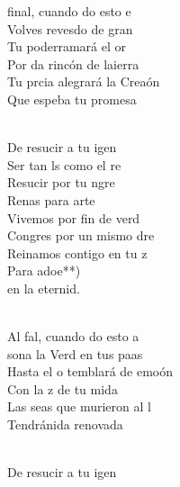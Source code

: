 \documentclass[12pt]{article}
\begin{document}
\begin{multicols*}{2}
\begin{cancion}%
	 final, cuando do esto e \\
	Volves revesdo de gran  \\
	Tu poderramará el or\\
	Por da rincón de laierra\\
	Tu prcia alegrará la Creaón\\
	Que espeba tu promesa\\\jump\\
	\begin{chorus}%
	De resucir a tu igen\\
	Ser tan ls como el re\\
	Resucir por tu ngre\\
	Renas para arte\\
	Vivemos por fin de verd\\
	Congres por un mismo dre\\
	Reinamos contigo en tu z\\
	Para adoe**)\\
	en la eternid.\\
	\end{chorus}%
	\jump\\
	Al fal, cuando do esto a  \\
	sona la Verd en tus paas \\
	Hasta el o temblará de emoón\\
	Con la z de tu mida\\
	Las seas que murieron al l\\
	Tendránida renovada\\\jump\\
	\begin{chorus}%
	De resucir a tu igen\\

\end{chorus}
\end{cancion}
\end{multicols*}
\end{document}
